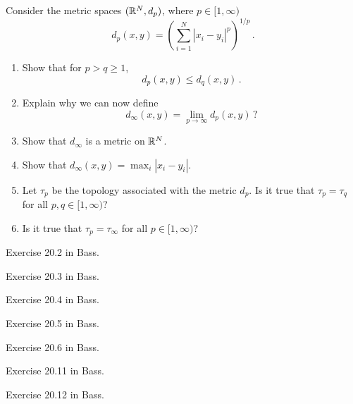 \documentclass[12pt]{amsart}
\begin{document}
\begin{question}
	Consider the metric spaces $(\mathbb{R}^N, d_p)$, where $p \in [1,\infty)$
	\begin{equation*}
		d_p(x,y) = \left( \sum_{i=1}^N | x_i - y_i|^p\right)^{1/p}\,.
	\end{equation*}
	\begin{enumerate}
		\item Show that for $p > q \geq 1$,
		      \begin{equation*}
			      d_p(x,y) \leq d_q(x,y) \,.
		      \end{equation*}
		\item Explain why we can now define
		      \begin{equation*}
			      d_\infty(x,y) = \lim_{p\to \infty} d_p (x,y) \,?
		      \end{equation*}
		\item Show that $d_\infty$ is a metric on $\mathbb{R}^N$.
		\item Show that $d_\infty(x,y) = \max_i | x_i - y_i |$.
		\item Let $\tau_p$ be the topology associated with the metric $d_p$.
		      Is it true that $\tau_p = \tau_q$ for all $p,q \in [1,\infty)$?
		\item  Is it true that $\tau_p = \tau_\infty$ for all $p \in [1,\infty)$?

	\end{enumerate}
\end{question}

\begin{question}
	Exercise 20.2 in Bass.
\end{question}

\begin{question}
	Exercise 20.3 in Bass.
\end{question}

\begin{question}
	Exercise 20.4 in Bass.
\end{question}

\begin{question}
	Exercise 20.5 in Bass.
\end{question}

\begin{question}
	Exercise 20.6 in Bass.
\end{question}

\begin{question}
	Exercise 20.11 in Bass.
\end{question}

\begin{question}
	Exercise 20.12 in Bass.
\end{question}
\end{document}
